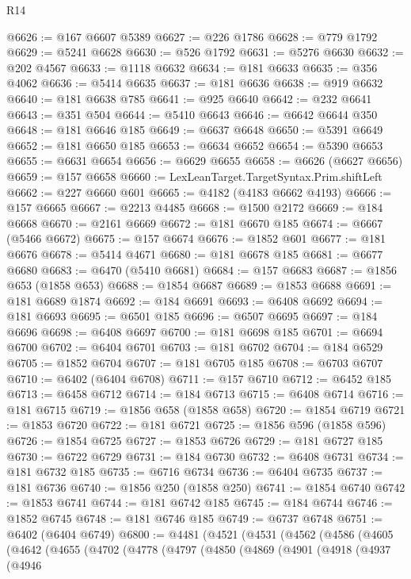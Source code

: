 \begin{lexlean}{R14}
\begin{coremodule}
@6626 := @167 @6607 @5389
@6627 := @226 @1786
@6628 := @779 @1792
@6629 := @5241 @6628
@6630 := @526 @1792
@6631 := @5276 @6630
@6632 := @202 @4567
@6633 := @1118 @6632
@6634 := @181 @6633
@6635 := @356 @4062
@6636 := @5414 @6635
@6637 := @181 @6636
@6638 := @919 @6632
@6640 := @181 @6638 @785
@6641 := @925 @6640
@6642 := @232 @6641
@6643 := @351 @504
@6644 := @5410 @6643
@6646 := @6642 @6644 @350
@6648 := @181 @6646 @185
@6649 := @6637 @6648
@6650 := @5391 @6649
@6652 := @181 @6650 @185
@6653 := @6634 @6652
@6654 := @5390 @6653
@6655 := @6631 @6654
@6656 := @6629 @6655
@6658 := @6626 (@6627 @6656)
@6659 := @157 @6658
@6660 := LexLeanTarget.TargetSyntax.Prim.shiftLeft
@6662 := @227 @6660 @601
@6665 := @4182 (@4183 @6662 @4193)
@6666 := @157 @6665
@6667 := @2213 @4485
@6668 := @1500 @2172
@6669 := @184 @6668
@6670 := @2161 @6669
@6672 := @181 @6670 @185
@6674 := @6667 (@5466 @6672)
@6675 := @157 @6674
@6676 := @1852 @601
@6677 := @181 @6676
@6678 := @5414 @4671
@6680 := @181 @6678 @185
@6681 := @6677 @6680
@6683 := @6470 (@5410 @6681)
@6684 := @157 @6683
@6687 := @1856 @653 (@1858 @653)
@6688 := @1854 @6687
@6689 := @1853 @6688
@6691 := @181 @6689 @1874
@6692 := @184 @6691
@6693 := @6408 @6692
@6694 := @181 @6693
@6695 := @6501 @185
@6696 := @6507 @6695
@6697 := @184 @6696
@6698 := @6408 @6697
@6700 := @181 @6698 @185
@6701 := @6694 @6700
@6702 := @6404 @6701
@6703 := @181 @6702
@6704 := @184 @6529
@6705 := @1852 @6704
@6707 := @181 @6705 @185
@6708 := @6703 @6707
@6710 := @6402 (@6404 @6708)
@6711 := @157 @6710
@6712 := @6452 @185
@6713 := @6458 @6712
@6714 := @184 @6713
@6715 := @6408 @6714
@6716 := @181 @6715
@6719 := @1856 @658 (@1858 @658)
@6720 := @1854 @6719
@6721 := @1853 @6720
@6722 := @181 @6721
@6725 := @1856 @596 (@1858 @596)
@6726 := @1854 @6725
@6727 := @1853 @6726
@6729 := @181 @6727 @185
@6730 := @6722 @6729
@6731 := @184 @6730
@6732 := @6408 @6731
@6734 := @181 @6732 @185
@6735 := @6716 @6734
@6736 := @6404 @6735
@6737 := @181 @6736
@6740 := @1856 @250 (@1858 @250)
@6741 := @1854 @6740
@6742 := @1853 @6741
@6744 := @181 @6742 @185
@6745 := @184 @6744
@6746 := @1852 @6745
@6748 := @181 @6746 @185
@6749 := @6737 @6748
@6751 := @6402 (@6404 @6749)
@6800 := @4481
    (@4521
      (@4531
        (@4562
          (@4586
            (@4605
              (@4642
                (@4655
                  (@4702
                    (@4778
                      (@4797
                        (@4850
                          (@4869
                            (@4901
                              (@4918
                                (@4937
                                  (@4946

\end{coremodule}
\end{lexlean}
